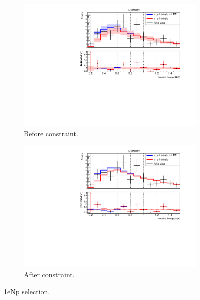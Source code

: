 \begin{figure}[H] 
\begin{center}
    \begin{subfigure}[b]{0.45\textwidth}
    \centering
    \includegraphics[width=1.00\textwidth]{Fakedata/set4/nue_numu_reco_e_H1_mc_fakedata_set4_nue_before_data_constraint.pdf}
    \caption{\label{fig:fakedata:set4:np_before_constrain} Before constraint.}
    \end{subfigure}
    \begin{subfigure}[b]{0.45\textwidth}
    \centering
    \includegraphics[width=1.00\textwidth]{Fakedata/set4/nue_numu_reco_e_H1_mc_fakedata_set4_univ_overlay_nue.pdf}
    \caption{\label{fig:fakedata:set4:np_after_constrain} After constraint.}
    \end{subfigure}
\caption{\label{fig:fakedata:set4:np_const} 1eNp selection.}
\end{center}
\end{figure}

